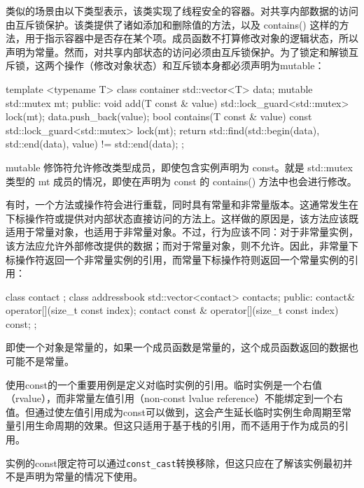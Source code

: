 类似的场景由以下类型表示，该类实现了线程安全的容器。对共享内部数据的访问由互斥锁保护。该类提供了诸如添加和删除值的方法，以及 contains() 这样的方法，用于指示容器中是否存在某个项。成员函数不打算修改对象的逻辑状态，所以声明为常量。然而，对共享内部状态的访问必须由互斥锁保护。为了锁定和解锁互斥锁，这两个操作（修改对象状态）和互斥锁本身都必须声明为mutable：

\begin{cpp}
template <typename T>
class container
{
    std::vector<T>     data;
    mutable std::mutex mt;
public:
    void add(T const & value)
    {
        std::lock_guard<std::mutex> lock(mt);
        data.push_back(value);
    }
    bool contains(T const & value) const
    {
        std::lock_guard<std::mutex> lock(mt);
        return std::find(std::begin(data), std::end(data), value)
               != std::end(data);
    }
};
\end{cpp}

mutable 修饰符允许修改类型成员，即使包含实例声明为 const。就是 std::mutex 类型的 mt 成员的情况，即使在声明为 const 的 contains() 方法中也会进行修改。

有时，一个方法或操作符会进行重载，同时具有常量和非常量版本。这通常发生在下标操作符或提供对内部状态直接访问的方法上。这样做的原因是，该方法应该既适用于常量对象，也适用于非常量对象。不过，行为应该不同：对于非常量实例，该方法应允许外部修改提供的数据；而对于常量对象，则不允许。因此，非常量下标操作符返回一个非常量实例的引用，而常量下标操作符则返回一个常量实例的引用：

\begin{cpp}
class contact {};
class addressbook
{
    std::vector<contact> contacts;
public:
    contact& operator[](size_t const index);
    contact const & operator[](size_t const index) const;
};
\end{cpp}

\begin{myNotic}
即使一个对象是常量的，如果一个成员函数是常量的，这个成员函数返回的数据也可能不是常量。
\end{myNotic}

使用const的一个重要用例是定义对临时实例的引用。临时实例是一个右值（rvalue），而非常量左值引用（non-const lvalue reference）不能绑定到一个右值。但通过使左值引用成为const可以做到，这会产生延长临时实例生命周期至常量引用生命周期的效果。但这只适用于基于栈的引用，而不适用于作为成员的引用。


实例的const限定符可以通过\verb|const_cast|转换移除，但这只应在了解该实例最初并不是声明为常量的情况下使用。


